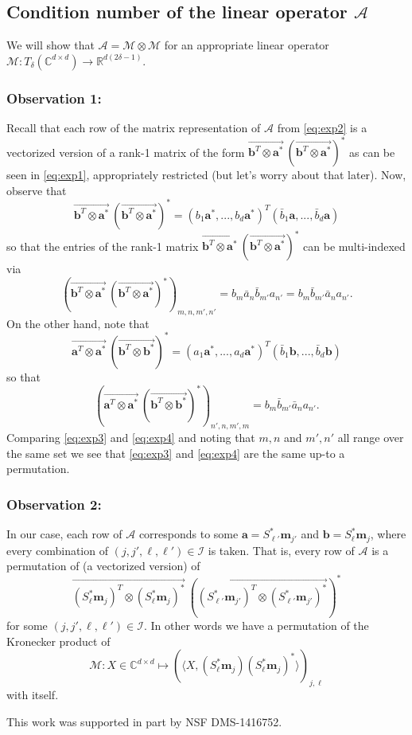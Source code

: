 \documentclass[]{spie}  %
\def \vec{\overrightarrow}
\def \a {\mathbf a}
\def \b {\mathbf b}
\def \m {\mathbf m}
\def \jj {{j'}}
\def \elll {{\ell'}}
\begin{document}
\subsection{Condition number of the linear operator $\mathcal{A}$}
We will show that $\mathcal{A} = \mathcal{M}\otimes\mathcal{M}$ for an appropriate linear operator $\mathcal{M}: T_\delta(\mathbb{C}^{d\times d}) \to \mathbb{R}^{d(2\delta-1)}$.

\subsubsection*{Observation 1:} Recall that each row of the matrix representation of $\mathcal{A}$ from \eqref{eq:exp2} is a vectorized version of a rank-1 matrix of the form $ \vec{\b^T \otimes \a^*} \ (\vec{\b^T \otimes \a^*})^*$ as can be seen in \eqref{eq:exp1}, appropriately restricted (but let's worry about that later). Now, observe that 
$$ \vec{\b^T \otimes \a^*} \ (\vec{\b^T \otimes \a^*})^* =  (b_1\a^*,...,b_d \a^*)^T(\bar{b}_1\a,...,\bar{b}_d \a)$$
so that the entries of the rank-1 matrix $\vec{\b^T \otimes \a^*} \ (\vec{\b^T \otimes \a^*})^*$ can be multi-indexed via
\begin{equation} (\vec{\b^T \otimes \a^*} \ (\vec{\b^T \otimes \a^*})^*)_{m,n,m',n'} = b_m \bar{a}_n\bar{b}_{m'}{a}_{n'} =  b_m \bar{b}_{m'}\bar{a}_n{a}_{n'}. \label{eq:exp3}\end{equation}
On the other hand, note that $$ \vec{\a^T \otimes \a^*} \ (\vec{\b^T \otimes \b^*})^* =  (a_1\a^*,...,a_d \a^*)^T(\bar{b}_1\b,...,\bar{b}_d \b)$$
so that 
\begin{equation} (\vec{\a^T \otimes \a^*} \ (\vec{\b^T \otimes \b^*})^*)_{n',n,m',m} = {b}_m\bar{b}_{m'}\bar{a}_n{a}_{n'}\label{eq:exp4}.\end{equation}
Comparing \eqref{eq:exp3} and \eqref{eq:exp4} and noting that $m,n$ and $m',n'$ all range over the same set we see that \eqref{eq:exp3} and \eqref{eq:exp4} are the same up-to a permutation.
\subsubsection*{Observation 2:} In our case, each row of $\mathcal{A}$ corresponds to some $\a = S_\elll^* \m_\jj$ and $\b=S_\ell^* \m_j$, where every combination of $(j,\jj, \ell, \elll) \in \mathcal{I}$ is taken.  That is, every row of $\mathcal{A}$ is a permutation of (a vectorized version) of%
$$\vec{(S_\ell^*\m_j)^T \otimes (S_\ell^*\m_j)^*} \ (\vec{(S_\elll^*\m_\jj)^T \otimes (S_\elll^*\m_\jj)^*})^*$$
for some $(j,\jj, \ell, \elll) \in \mathcal{I}$.
In other words we have a permutation of the Kronecker product of $$\mathcal{M}: X\in \mathbb{C}^{d\times d} \mapsto \left(\langle X, (S_\ell^*\m_j)(S_\ell^*\m_j)^*\rangle\right)_{j,\ell}$$
with itself.

\acknowledgments %
 
This work was supported in part by NSF DMS-1416752.%

\end{document}
